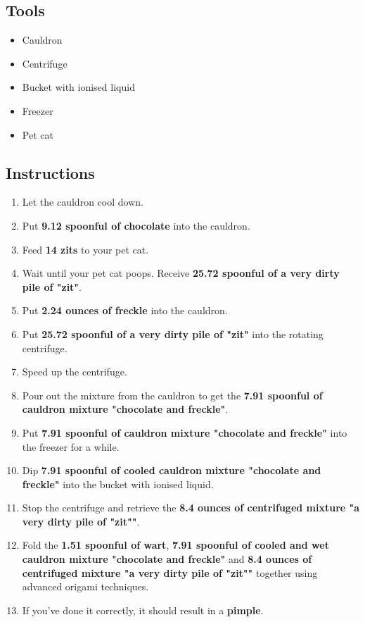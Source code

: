 \documentclass{article}
\begin{document}
\subsection{Tools}\begin{itemize}
\item 
Cauldron
\item 
Centrifuge
\item 
Bucket with ionised liquid
\item 
Freezer
\item 
Pet cat
\end{itemize}
\subsection{Instructions}\begin{enumerate}
\item 
Let the cauldron cool down.
\item 
Put \textbf{9.12 spoonful of chocolate} into the cauldron.
\item 
Feed \textbf{14 zits} to your pet cat.
\item 
Wait until your pet cat poops. Receive \textbf{25.72 spoonful of a very dirty pile of "zit"}.
\item 
Put \textbf{2.24 ounces of freckle} into the cauldron.
\item 
Put \textbf{25.72 spoonful of a very dirty pile of "zit"} into the rotating centrifuge.
\item 
Speed up the centrifuge.
\item 
Pour out the mixture from the cauldron to get the \textbf{7.91 spoonful of cauldron mixture "chocolate and freckle"}.
\item 
Put \textbf{7.91 spoonful of cauldron mixture "chocolate and freckle"} into the freezer for a while.
\item 
Dip \textbf{7.91 spoonful of cooled cauldron mixture "chocolate and freckle"} into the bucket with ionised liquid.
\item 
Stop the centrifuge and retrieve the \textbf{8.4 ounces of centrifuged mixture "a very dirty pile of "zit""}.
\item 
Fold the \textbf{1.51 spoonful of wart}, \textbf{7.91 spoonful of cooled and wet cauldron mixture "chocolate and freckle"} and \textbf{8.4 ounces of centrifuged mixture "a very dirty pile of "zit""} together using advanced origami techniques.
\item 
If you've done it correctly, it should result in a \textbf{pimple}.
\end{enumerate}
\newpage
\end{document}
